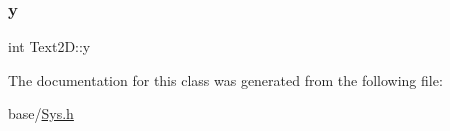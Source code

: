 \mbox{\label{classText2D_a2b4150bdd93e15abdeb5caba4511c7f2}} 
\subsubsection{\texorpdfstring{y}{y}}
{\footnotesize\ttfamily int Text2\+D\+::y}



The documentation for this class was generated from the following file\+:\begin{DoxyCompactItemize}
\item 
base/\mbox{\hyperlink{Sys_8h}{Sys.\+h}}\end{DoxyCompactItemize}
